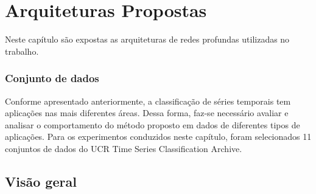 \chapter{Arquiteturas Propostas} \label{cap3}

Neste capítulo são expostas as arquiteturas de redes profundas utilizadas no trabalho.


\subsection{Conjunto de dados}

Conforme apresentado anteriormente, a classificação de séries temporais tem aplicações nas mais diferentes áreas. Dessa forma, faz-se necessário avaliar e analisar o comportamento do método proposto em dados de diferentes tipos de aplicações. Para os experimentos conduzidos neste capítulo, foram selecionados 11 conjuntos de dados do UCR Time Series Classification Archive\cite{UCRArchive}. 




\section{Visão geral}



